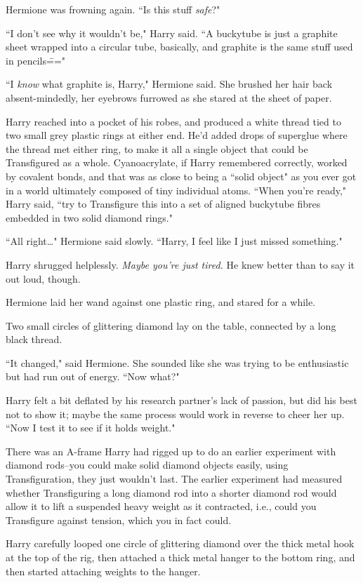 Hermione was frowning again. ``Is this stuff \emph{safe}?"

``I don't see why it wouldn't be," Harry said. ``A buckytube is just a graphite sheet wrapped into a circular tube, basically, and graphite is the same stuff used in pencils\==="

``I \emph{know} what graphite is, Harry," Hermione said. She brushed her hair back absent-mindedly, her eyebrows furrowed as she stared at the sheet of paper.

Harry reached into a pocket of his robes, and produced a white thread tied to two small grey plastic rings at either end. He'd added drops of superglue where the thread met either ring, to make it all a single object that could be Transfigured as a whole. Cyanoacrylate, if Harry remembered correctly, worked by covalent bonds, and that was as close to being a ``solid object" as you ever got in a world ultimately composed of tiny individual atoms. ``When you're ready," Harry said, ``try to Transfigure this into a set of aligned buckytube fibres embedded in two solid diamond rings."

``All right{\ldots}" Hermione said slowly. ``Harry, I feel like I just missed something."

Harry shrugged helplessly. \emph{Maybe you're just tired.} He knew better than to say it out loud, though.

Hermione laid her wand against one plastic ring, and stared for a while.

Two small circles of glittering diamond lay on the table, connected by a long black thread.

``It changed," said Hermione. She sounded like she was trying to be enthusiastic but had run out of energy. ``Now what?"

Harry felt a bit deflated by his research partner's lack of passion, but did his best not to show it; maybe the same process would work in reverse to cheer her up. ``Now I test it to see if it holds weight."

There was an A-frame Harry had rigged up to do an earlier experiment with diamond rods\---you could make solid diamond objects easily, using Transfiguration, they just wouldn't last. The earlier experiment had measured whether Transfiguring a long diamond rod into a shorter diamond rod would allow it to lift a suspended heavy weight as it contracted, i.e., could you Transfigure against tension, which you in fact could.

Harry carefully looped one circle of glittering diamond over the thick metal hook at the top of the rig, then attached a thick metal hanger to the bottom ring, and then started attaching weights to the hanger.

